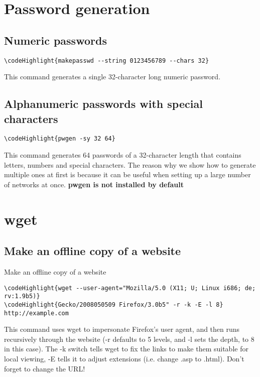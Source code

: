 \documentclass[12pt,a4paper]{article}
\begin{document}
\section{Password generation}
\label{Password generation}
\subsection{Numeric passwords}
\begin{Verbatim}[commandchars=\\\{\}]
\codeHighlight{makepasswd --string 0123456789 --chars 32}
\end{Verbatim}
This command generates a single 32-character long numeric password.

\subsection{Alphanumeric passwords with special characters}
\begin{Verbatim}[commandchars=\\\{\}]
\codeHighlight{pwgen -sy 32 64}
\end{Verbatim}
This command generates 64 passwords of a 32-character length that contains letters, numbers and special characters. The reason why we show how to generate multiple ones at first is because it can be useful when setting up a large number of networks at once.  \textbf{pwgen is not installed by default}

\section{wget}
\subsection{Make an offline copy of a website}
\label{}Make an offline copy of a website
\begin{Verbatim}[commandchars=\\\{\}]
\codeHighlight{wget --user-agent="Mozilla/5.0 (X11; U; Linux i686; de; rv:1.9b5)}
\codeHighlight{Gecko/2008050509 Firefox/3.0b5" -r -k -E -l 8} http://example.com
\end{Verbatim}
This command uses wget to impersonate Firefox's user agent, and then runs recursively through the website (-r defaults to 5 levels, and -l sets the depth, to 8 in this case). The -k switch tells wget to fix the links to make them suitable for local viewing, -E tells it to adjust extensions (i.e. change .asp to .html).  Don't forget to change the URL!
\end{document}
